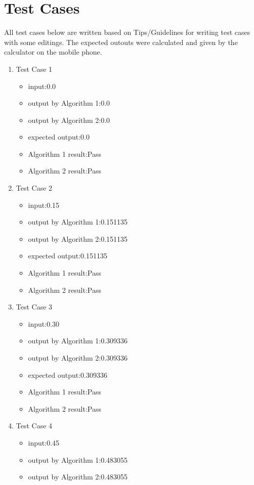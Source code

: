\documentclass[10pt,a4paper,twoside]{article}
\begin{document}
\section{Test Cases}
All test cases below are written based on Tips/Guidelines for writing test cases with some editings.\cite{ref1}
The expected outouts were calculated and given by the calculator on the mobile phone.
\begin{enumerate}
\item 
Test Case 1
\begin{itemize}
    \item input:0.0
    \item output by Algorithm 1:0.0
    \item output by Algorithm 2:0.0
    \item expected output:0.0
    \item Algorithm 1 result:Pass
    \item Algorithm 2 result:Pass
\end{itemize}
\item 
Test Case 2
\begin{itemize}
    \item input:0.15
    \item output by Algorithm 1:0.151135
    \item output by Algorithm 2:0.151135
    \item expected output:0.151135
    \item Algorithm 1 result:Pass
    \item Algorithm 2 result:Pass
\end{itemize}
\item 
Test Case 3
\begin{itemize}
    \item input:0.30
    \item output by Algorithm 1:0.309336
    \item output by Algorithm 2:0.309336
    \item expected output:0.309336
    \item Algorithm 1 result:Pass
    \item Algorithm 2 result:Pass
\end{itemize}
\item 
Test Case 4
\begin{itemize}
    \item input:0.45
    \item output by Algorithm 1:0.483055
    \item output by Algorithm 2:0.483055

\end{itemize}
\end{enumerate}
\end{document}
